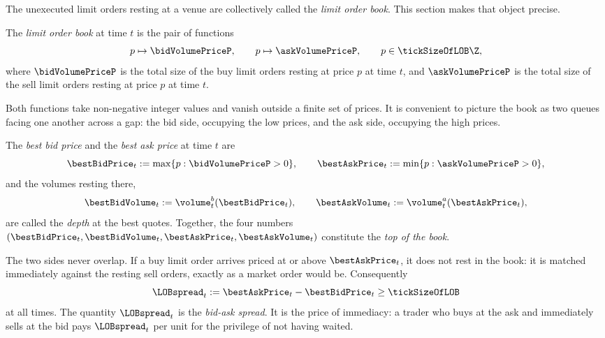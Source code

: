 The unexecuted limit orders resting at a venue are collectively called the
\emph{limit order book}.
This section makes that object precise.

\begin{defi}
\label{def.limitOrderBook}
The \emph{limit order book} at time $t$ is the pair of functions
\begin{equation}
\label{eq.limitOrderBook}
p \mapsto \bidVolumePriceP, \qquad p \mapsto \askVolumePriceP, \qquad p \in \tickSizeOfLOB \Z,
\end{equation}
where $\bidVolumePriceP$ is the total size of the buy limit orders resting at price $p$ at
time $t$,
and $\askVolumePriceP$ is the total size of the sell limit orders resting at price $p$ at
time $t$.
\end{defi}

Both functions take non-negative integer values and vanish outside a finite set of prices.
It is convenient to picture the book as two queues facing one another across a gap:
the bid side, occupying the low prices,
and the ask side, occupying the high prices.

\begin{defi}
\label{def.bestQuotes}
The \emph{best bid price} and the \emph{best ask price} at time $t$ are
\begin{equation}
\label{eq.bestQuotes}
\bestBidPrice_t := \max \lbrace p : \bidVolumePriceP > 0 \rbrace,
\qquad
\bestAskPrice_t := \min \lbrace p : \askVolumePriceP > 0 \rbrace,
\end{equation}
and the volumes resting there,
\begin{equation*}
\bestBidVolume_t := \volume^{b}_{t}(\bestBidPrice_t),
\qquad
\bestAskVolume_t := \volume^{a}_{t}(\bestAskPrice_t),
\end{equation*}
are called the \emph{depth} at the best quotes.
Together, the four numbers $(\bestBidPrice_t, \bestBidVolume_t, \bestAskPrice_t, \bestAskVolume_t)$
constitute the \emph{top of the book}.
\end{defi}

The two sides never overlap.
If a buy limit order arrives priced at or above $\bestAskPrice_t$,
it does not rest in the book:
it is matched immediately against the resting sell orders,
exactly as a market order would be.
Consequently
\begin{equation}
\label{eq.positiveSpread}
\LOBspread_t := \bestAskPrice_t - \bestBidPrice_t \geq \tickSizeOfLOB
\end{equation}
at all times.
The quantity $\LOBspread_t$ is the \emph{bid-ask spread}.
It is the price of immediacy:
a trader who buys at the ask and immediately sells at the bid
pays $\LOBspread_t$ per unit for the privilege of not having waited.

